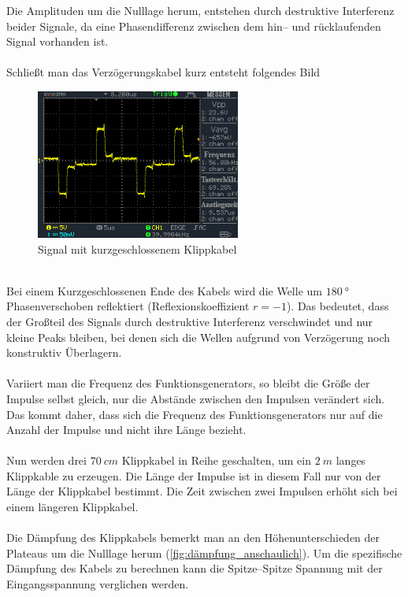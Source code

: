 \documentclass[a4paper,10pt]{article}
\numberwithin{equation}{section}
\begin{document}
Die Amplituden um die Nulllage herum, entstehen durch destruktive Interferenz beider Signale, da eine Phasendifferenz zwischen dem hin-- und rücklaufenden Signal vorhanden ist.\\\\
Schließt man das Verzögerungskabel kurz entsteht folgendes Bild
\begin{figure}[h]
        \centering
        \includegraphics[width=0.6\textwidth]{data/DS0031.BMP.png}
        \caption{Signal mit kurzgeschlossenem Klippkabel}
\end{figure}\\
Bei einem Kurzgeschlossenen Ende des Kabels wird die Welle um $\SI{180}{\degree}$ Phasenverschoben reflektiert (Reflexionskoeffizient $r=-1$).
Das bedeutet, dass der Großteil des Signals durch destruktive Interferenz verschwindet und nur kleine Peaks bleiben, bei denen sich die Wellen aufgrund von Verzögerung noch konstruktiv Überlagern.\\\\
Variiert man die Frequenz des Funktionsgenerators, so bleibt die Größe der Impulse selbst gleich, nur die Abstände zwischen den Impulsen verändert sich.
Das kommt daher, dass sich die Frequenz des Funktionsgenerators nur auf die Anzahl der Impulse und nicht ihre Länge bezieht.\\\\
Nun werden drei $\SI{70}{cm}$ Klippkabel in Reihe geschalten, um ein $\SI{2}{m}$ langes Klippkable zu erzeugen.
Die Länge der Impulse ist in diesem Fall nur von der Länge der Klippkabel bestimmt.
Die Zeit zwischen zwei Impulsen erhöht sich bei einem längeren Klippkabel.\\\\
Die Dämpfung des Klippkabels bemerkt man an den Höhenunterschieden der Plateaus um die Nulllage herum (\ref{fig:dämpfung_anschaulich}).
Um die spezifische Dämpfung des Kabels zu berechnen kann die Spitze--Spitze Spannung mit der Eingangsspannung verglichen werden.
\end{document}
